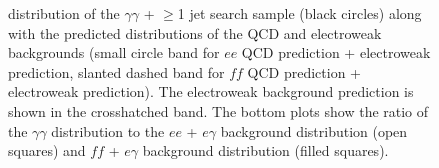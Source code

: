 \documentclass[dissertation_bw.tex]{subfiles}
\begin{document}
\begin{figure}
	\caption{\MET distribution of the $\gamma\gamma$ + $\geq$1 jet search sample (black circles) along with the predicted \MET distributions of the QCD and electroweak backgrounds (small circle band for $ee$ QCD prediction + electroweak prediction, slanted dashed band for $\mathit{ff}$ QCD prediction + electroweak prediction).  The electroweak background prediction is shown in the crosshatched band.  The bottom plots show the ratio of the $\gamma\gamma$ \MET distribution to the $ee$ + $e\gamma$ background distribution (open squares) and $\mathit{ff}$ + $e\gamma$ background distribution (filled squares).}
	\label{fig:MET_final_geq1j}
\end{figure}
\end{document}
